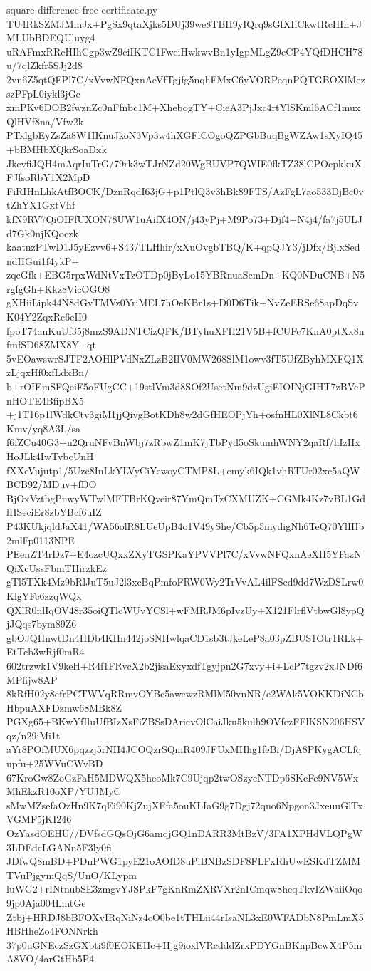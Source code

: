 \documentclass[11pt]{article}
\theoremstyle{definition}
\theoremstyle{remark}
\begin{document}
\begin{filecontents*}[overwrite]{square-difference-free-certificate.py}
TU4RkSZMJMmJx+PgSx9qtaXjks5DUj39we8TBH9yIQrq9sGfXIiCkwtRcHIh+JMLUbBDEQUluyg4
uRAFmxRRcHIhCgp3wZ9ciIKTC1FwciHwkwvBn1yIgpMLgZ9cCP4YQfDHCH78u/7qlZkfr5SJj2d8
2vn6Z5qtQFPl7C/xVvwNFQxnAeVfTgjfg5nqhFMxC6yVORPeqnPQTGBOXlMezszPFpL0iykl3jGc
xmPKv6DOB2fwznZc0nFfnbc1M+XhebogTY+CieA3PjJxc4rtYlSKml6ACf1muxQlHVf8na/Vfw2k
PTxlgbEyZsZa8W1IKnuJkoN3Vp3w4hXGFlCOgoQZPGbBuqBgWZAw1sXyIQ45+bBMHbXQkrSoaDxk
JkcvfiJQH4mAqrIuTrG/79rk3wTJrNZd20WgBUVP7QWIE0fkTZ38lCPOcpkkuXFJfsoRbY1X2MpD
FiRIHnLhkAtfBOCK/DznRqdI63jG+p1PtlQ3v3hBk89FTS/AzFgL7ao533DjBc0vtZhYX1GxtVhf
kfN9RV7QiOIFfUXON78UW1uAifX4ON/j43yPj+M9Po73+Djf4+N4j4/fa7j5ULJd7Gk0njKQoczk
kaatnzPTwD1J5yEzvv6+S43/TLHhir/xXuOvgbTBQ/K+qpQJY3/jDfx/BjlxSedndHGui1f4ykP+
zqcGfk+EBG5rpxWdNtVxTzOTDp0jByLo15YBRnuaScmDn+KQ0NDuCNB+N5rgfgGh+Kkz8VicOGO8
gXHiiLipk44N8dGvTMVz0YriMEL7hOeKBr1s+D0D6Tik+NvZeERSe68apDqSvK04Y2ZqxRc6eII0
fpoT74anKuUf35j8mzS9ADNTCizQFK/BTyhuXFH21V5B+fCUFc7KnA0ptXx8nfmfSD68ZMX8Y+qt
5vEOawswrSJTF2AOHlPVdNxZLzB2IlV0MW268SlM1owv3fT5UfZByhMXFQ1XzLjqxHf0xfLdxBn/
b+rOIEmSFQeiF5oFUgCC+19stlVm3d8SOf2UsetNm9dzUgiEIOINjGIHT7zBVcPnHOTE4BfipBX5
+j1T16p1lWdkCtv3giM1jjQivgBotKDh8w2dGfHEOPjYh+osfnHL0XlNL8Ckbt6Kmv/yq8A3L/sa
f6fZCu40G3+n2QruNFvBnWbj7zRbwZ1mK7jTbPyd5oSkumhWNY2qaRf/hIzHxHoJLk4IwTvbcUnH
fXXeVujutp1/5Uzc8InLkYLVyCiYewoyCTMP8L+emyk6IQk1vhRTUr02xc5aQWBCB92/MDuv+fDO
BjOxVztbgPnwyWTwlMFTBrKQveir87YmQmTzCXMUZK+CGMk4Kz7vBL1GdlHSeciEr8zbYBcf6uIZ
P43KUkjqldJaX41/WA56olR8LUeUpB4o1V49yShe/Cb5p5mydigNh6TeQ70YlIHb2mlFp0113NPE
PEenZT4rDz7+E4ozcUQxxZXyTGSPKaYPVVPl7C/xVvwNFQxnAeXH5YFazNQiXcUssFbmTHirzkEz
gTl5TXk4Mz9bRlJuT5uJ2l3xcBqPmfoFRW0Wy2TrVvAL4ilFScd9dd7WzDSLrw0KlgYFc6zzqWQx
QXlR0nlIqOV48r35oiQTlcWUvYCSl+wFMRJM6pIvzUy+X121FlrflVtbwGl8ypQjJQqs7bym89Z6
gbOJQHnwtDn4HDb4KHn442joSNHwlqaCD1sb3tJkeLeP8a03pZBUS1Otr1RLk+EtTcb3wRjf0mR4
602trzwk1V9keH+R4f1FRvcX2b2jisaExyxdfTgyjpn2G7xvy+i+LcP7tgzv2xJNDf6MPfijw8AP
8kRfH02y8efrPCTWVqRRmvOYBc5awewzRMlM50vnNR/e2WAk5VOKKDiNCbHbpuAXFDzmw68MBk8Z
PGXg65+BKwYfIluUfBIzXsFiZBSsDAricvOlCaiJku5kulh9OVfczFFlKSN206HSVqz/n29iMi1t
aYr8POfMUX6pqzzj5rNH4JCOQzrSQmR409JFUxMHhg1feBi/DjA8PKygACLfqupfu+25WVuCWvBD
67KroGw8ZoGzFaH5MDWQX5heoMk7C9Ujqp2twOSzycNTDp6SKcFe9NV5WxMhEkzR10oXP/YUJMyC
sMwMZsefaOzHn9K7qEi90KjZujXFfa5ouKLIaG9g7Dgj72qno6Npgon3JxeuuGlTxVGMF5jKI246
OzYasdOEHU//DVfsdGQsOjG6amqjGQ1nDARR3MtBzV/3FA1XPHdVLQPgW3LDEdcLGANn5F3ly0fi
JDfwQ8mBD+PDnPWG1pyE21oAOfD8uPiBNBzSDF8FLFxRhUwESKdTZMMTVuPjgymQqS/UnO/KLypm
luWG2+rINtnubSE3zmgvYJSPkF7gKnRmZXRVXr2nICmqw8hcqTkvIZWaiiOqo9jp0Aja004LmtGe
Ztbj+HRDJ8bBFOXvIRqNiNz4cO0be1tTHLii44rIsaNL3xE0WFADbN8PmLmX5HBHheZo4FONNrkh
37p0uGNEczSzGXbti9f0EOKEHc+Hjg9ioxlVRcdddZrxPDYGnBKnpBcwX4P5mA8VO/4arGtHb5P4

\end{filecontents*}
\end{document}

